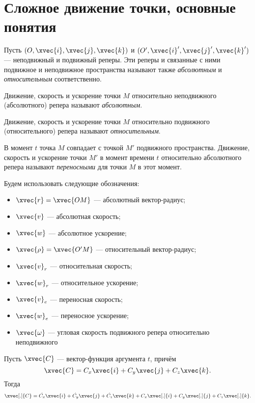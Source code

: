 \section{Сложное движение точки, основные понятия}

Пусть $(O, \xvec{i}, \xvec{j}, \xvec{k})$ и $(O', \xvec{i}', \xvec{j}',
\xvec{k}')$
--- неподвижный и подвижный реперы. Эти реперы и связанные с ними подвижное и
неподвижное пространства называют также \textit{абсолютным} и
\textit{относительным} соответственно.

\begin{definition}
  Движение, скорость и ускорение точки $M$ относительно неподвижного
  (абсолютного) репера называют \textit{абсолютным}.
\end{definition}

\begin{definition}
  Движение, скорость и ускорение точки $M$ относительно подвижного
  (относительного) репера называют \textit{относительным}.
\end{definition}

\begin{definition}
  В момент $t$ точка $M$ совпадает с точкой $M'$ подвижного пространства.
  Движение, скорость и ускорение точки $M'$ в момент времени $t$ относительно
  абсолютного репера называют \textit{переносными} для точки $M$ в этот момент.
\end{definition}

Будем использовать следующие обозначения:
\begin{itemize}
  \item $\xvec{r} = \xvec{OM}$ --- абсолютный вектор-радиус;
  \item $\xvec{v}$ --- абсолютная скорость;
  \item $\xvec{w}$ --- абсолютное ускорение;
  \item $\xvec{\rho} = \xvec{O'M}$ --- относительный вектор-радиус;
  \item $\xvec{v}_r$ --- относительная скорость;
  \item $\xvec{w}_r$ --- относительное ускорение;
  \item $\xvec{v}_e$ --- переносная скорость;
  \item $\xvec{w}_e$ --- переносное ускорение;
  \item $\xvec{\omega}$ --- угловая скорость подвижного репера относительно
    неподвижного
\end{itemize}

Пусть $\xvec{C}$ --- вектор-функция аргумента $t$, причём
\begin{equation}
  \xvec{C} = C_x \xvec{i} + C_y \xvec{j} + C_z \xvec{k}.
\end{equation}
Тогда
\begin{equation}
  \label{eq:vector_function_full_derivative}
  \xvec[.]{C} = \dot{C_x} \xvec{i} + \dot{C_y} \xvec{j} + \dot{C_z} \xvec{k}
    + C_x \xvec[.]{i} + C_y \xvec[.]{j} + C_z \xvec[.]{k}.
\end{equation}


